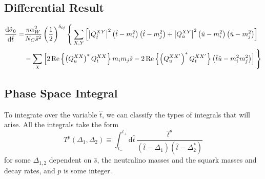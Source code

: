 \documentclass[../main.tex]{subfiles}
\begin{document}
\subsection{Differential Result}
\begin{align}
	\nonumber
	\d[\hat{t}]{\hat{\sigma}_0} = & \frac{\pi \alpha_W^2}{N_C \hat{s}^2}
	\pclosed{\frac{1}{2}}^{\delta_{ij}} \Bigg\{ \sum_{X,Y}
	\bclosed{\abs{Q^{XY}_{\hat{t}}}^2
		\pclosed{\hat{t}-m_i^2}\pclosed{\hat{t}-m_j^2} +
		\abs{Q^{XY}_{\hat{u}}}^2
	\pclosed{\hat{u}-m_i^2}\pclosed{\hat{u}-m_j^2}}                      \\
	                              & - \sum_X
	\bclosed{2\Re{\pclosed{Q_{u}^{XX}}^\ast Q_{t}^{XX}} m_i m_j \hat{s} -
		2\Re{\pclosed{Q_{u}^{XX^\prime}}^\ast Q_{t}^{XX^\prime}}
		\pclosed{\hat{t}\hat{u} - m_i^2m_j^2}} \Bigg\}
\end{align}

\subsection{Phase Space Integral}
To integrate over the variable \(\hat{t}\), we can classify the types of
integrals that will arise. All the integrals take the form
\begin{equation}
	T^p(\Delta_1, \Delta_2) \equiv \int_{t_-}^{t_+} \!\mathrm{d}\hat{t}\,
	\frac{\hat{t}^p}{(\hat{t}-\Delta_1)(\hat{t}-\Delta_2^\ast)}
\end{equation}
for some \(\Delta_{1,2}\) dependent on \(\hat{s}\), the neutralino masses and
the squark masses and decay rates, and \(p\) is some integer.
\end{document}
